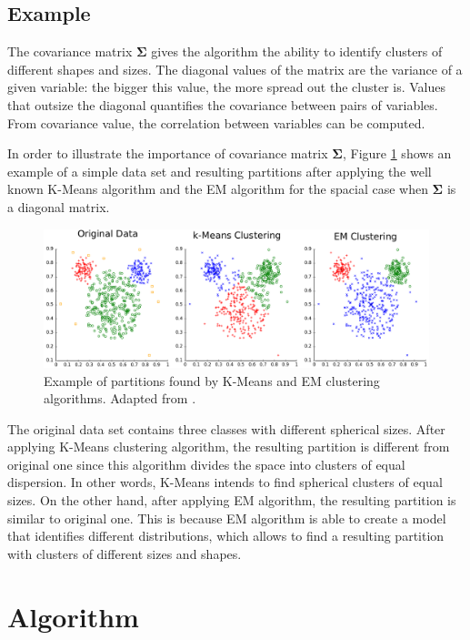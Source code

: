 \subsection{Example}

The covariance matrix $\bm{\Sigma}$ gives the algorithm the ability to identify clusters of different shapes and sizes. The diagonal values of the matrix are the variance of a given variable: the bigger this value, the more spread out the cluster is. Values that outsize the diagonal quantifies the covariance between pairs of variables. From covariance value, the correlation between variables can be computed.

In order to illustrate the importance of covariance matrix $\bm{\Sigma}$, Figure \ref{example_partition} shows an example of a simple data set and resulting partitions after applying the well known K-Means algorithm and the EM algorithm for the spacial case when $\bm{\Sigma}$ is a diagonal matrix. 

\begin{figure}[ht]
\centering
\includegraphics[width=13cm]{Part 3 - Learning Systems/Unsupervised Learning/Expectation-Maximization/figures/ClusterAnalysis_Mouse.png}
\caption{Example of partitions found by K-Means and EM clustering algorithms. Adapted from \cite{Chire}.}
\label{example_partition}
\end{figure}

The original data set contains three classes with different spherical sizes. After applying K-Means clustering algorithm, the resulting partition is different from original one since this algorithm divides the space into clusters of equal dispersion. In other words, K-Means intends to find spherical clusters of equal sizes. On the other hand, after applying EM algorithm, the resulting partition is similar to original one. This is because EM algorithm is able to create a model that identifies different distributions, which allows to find a resulting partition with clusters of different sizes and shapes.

\section{Algorithm}
\label{sec:algorithm}

